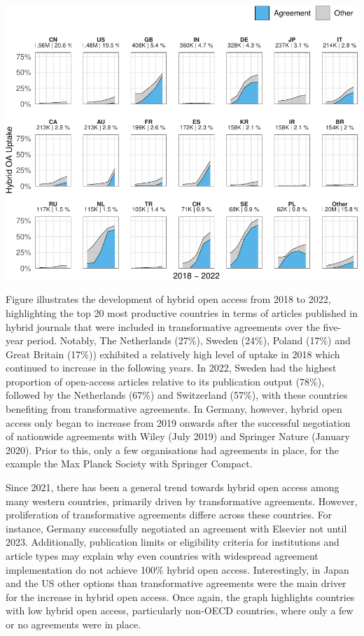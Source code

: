 \documentclass[a4paper,man,floatsintext,longtable,noextraspace,12pt]{apa6}
\begin{document}
\begin{center}\includegraphics[width=0.99\linewidth]{fig/country_top_20_plot-1} \end{center}

Figure illustrates the development of hybrid open access from 2018 to
2022, highlighting the top 20 most productive countries in terms of
articles published in hybrid journals that were included in
transformative agreements over the five-year period. Notably, The
Netherlands (27\%), Sweden (24\%), Poland (17\%) and Great Britain
(17\%)) exhibited a relatively high level of uptake in 2018 which
continued to increase in the following years. In 2022, Sweden had the
highest proportion of open-access articles relative to its publication
output (78\%), followed by the Netherlands (67\%) and Switzerland
(57\%), with these countries benefiting from transformative agreements.
In Germany, however, hybrid open access only began to increase from 2019
onwards after the successful negotiation of nationwide agreements with
Wiley (July 2019) and Springer Nature (January 2020). Prior to this,
only a few organisations had agreements in place, for the example the
Max Planck Society with Springer Compact.

Since 2021, there has been a general trend towards hybrid open access
among many western countries, primarily driven by transformative
agreements. However, proliferation of transformative agreements differe
across these countries. For instance, Germany successfully negotiated an
agreement with Elsevier not until 2023. Additionally, publication limits
or eligibility criteria for institutions and article types may explain
why even countries with widespread agreement implementation do not
achieve 100\% hybrid open access. Interestingly, in Japan and the US
other options than transformative agreements were the main driver for
the increase in hybrid open access. Once again, the graph highlights
countries with low hybrid open access, particularly non-OECD countries,
where only a few or no agreements were in place.
\end{document}
